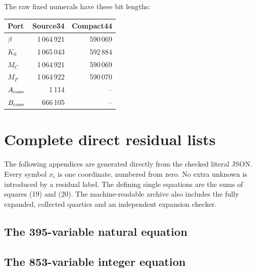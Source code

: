 \documentclass[11pt,letterpaper]{article}
\theoremstyle{definition}\newtheorem{definition}[theorem]{Definition}
\theoremstyle{remark}\newtheorem{remark}[theorem]{Remark}
\begin{document}
The raw fixed numerals have these bit lengths:
\begin{center}\small
\begin{tabular}{lrr}\toprule
Port&Source34&Compact44\\\midrule
$\beta$&1\,064\,921&590\,069\\
$K_0$&1\,065\,043&592\,884\\
$M_C$&1\,064\,921&590\,069\\
$M_F$&1\,064\,922&590\,070\\
$A_{\rm cone}$&1\,114&--\\
$B_{\rm cone}$&666\,105&--\\\bottomrule
\end{tabular}
\end{center}

\section{Complete direct residual lists}\label{app:residuals}
The following appendices are generated directly from the checked literal JSON. Every symbol $x_i$ is one coordinate, numbered from zero. No extra unknown is introduced by a residual label. The defining single equations are the sums of squares (19) and (20). The machine-readable archive also includes the fully expanded, collected quartics and an independent expansion checker.
\subsection{The 395-variable natural equation}
\clearpage
\subsection{The 853-variable integer equation}
\end{document}
